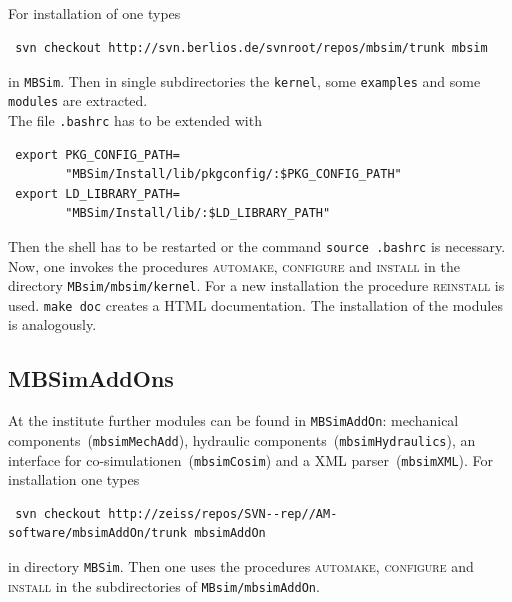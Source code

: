 \subsection{\MBSim}
For installation of \MBSim{} one types
\begin{verbatim}
 svn checkout http://svn.berlios.de/svnroot/repos/mbsim/trunk mbsim
\end{verbatim}
in \texttt{MBSim}. Then in single subdirectories the \texttt{kernel}, some \texttt{examples} and some \texttt{modules} are extracted.\\
The file \texttt{.bashrc} has to be extended with
\begin{verbatim}
 export PKG_CONFIG_PATH=
        "MBSim/Install/lib/pkgconfig/:$PKG_CONFIG_PATH"
 export LD_LIBRARY_PATH=
        "MBSim/Install/lib/:$LD_LIBRARY_PATH"
\end{verbatim}
Then the shell has to be restarted or the command \texttt{source .bashrc} is necessary.\\
Now, one invokes the procedures \textsc{automake, configure} and \textsc{install} in the directory \texttt{MBsim/mbsim/kernel}. For a new installation the procedure \textsc{reinstall} is used. \texttt{make doc} creates a HTML documentation. The installation of the modules is analogously.

\subsection{MBSimAddOns}
{\small At the institute further modules can be found in \texttt{MBSimAddOn}: mechanical components~(\texttt{mbsimMechAdd}), hydraulic components~(\texttt{mbsimHydraulics}), an interface for co-simulationen~(\texttt{mbsimCosim}) and a XML parser~(\texttt{mbsimXML}). For installation one types
\begin{verbatim}
 svn checkout http://zeiss/repos/SVN--rep//AM-software/mbsimAddOn/trunk mbsimAddOn
\end{verbatim}
in directory \texttt{MBSim}. Then one uses the procedures \textsc{automake, configure} and \textsc{install} in the subdirectories of \texttt{MBsim/mbsimAddOn}.
}


